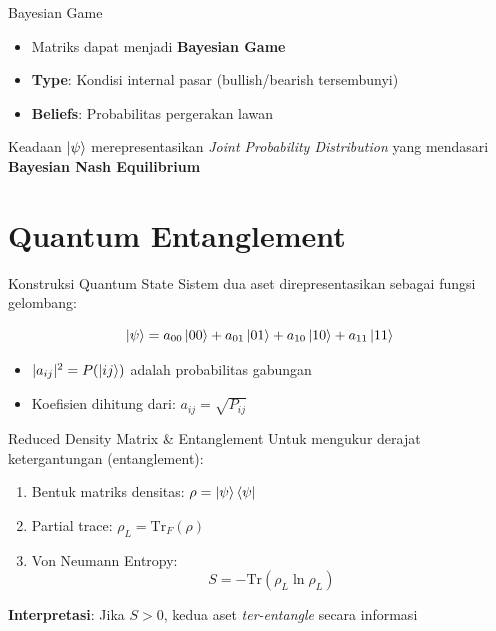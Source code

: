 \documentclass[aspectratio=169]{beamer}
\begin{document}
\begin{frame}{Bayesian Game}
    \begin{itemize}
        \item Matriks dapat menjadi \textbf{Bayesian Game}
        \item \textbf{Type}: Kondisi internal pasar (bullish/bearish tersembunyi)
        \item \textbf{Beliefs}: Probabilitas pergerakan lawan
    \end{itemize}
    
    \vspace{0.5cm}
    
    Keadaan $\ket{\psi}$ merepresentasikan \textit{Joint Probability Distribution} yang mendasari \textbf{Bayesian Nash Equilibrium}
\end{frame}

\section{Quantum Entanglement}

\begin{frame}{Konstruksi Quantum State}
    Sistem dua aset direpresentasikan sebagai fungsi gelombang:
    
    \begin{equation}
        \ket{\psi} = a_{00} \ket{00} + a_{01} \ket{01} + a_{10} \ket{10} + a_{11} \ket{11}
    \end{equation}
    
    \vspace{0.5cm}
    
    \begin{itemize}
        \item $|a_{ij}|^2 = P(\ket{ij})$ adalah probabilitas gabungan
        \item Koefisien dihitung dari: $a_{ij} = \sqrt{P_{ij}}$
    \end{itemize}
\end{frame}

\begin{frame}{Reduced Density Matrix \& Entanglement}
    Untuk mengukur derajat ketergantungan (entanglement):
    
    \begin{enumerate}
        \item Bentuk matriks densitas: $\rho = \ket{\psi}\bra{\psi}$
        \item Partial trace: $\rho_L = \text{Tr}_F(\rho)$
        \item Von Neumann Entropy:
        \begin{equation}
            S = -\text{Tr}(\rho_L \ln \rho_L)
        \end{equation}
    \end{enumerate}
    
    \vspace{0.5cm}
    
    \textbf{Interpretasi}: Jika $S > 0$, kedua aset \textit{ter-entangle} secara informasi
\end{frame}
\end{document}
